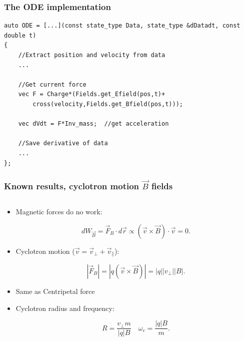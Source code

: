 \documentclass{beamer}
\begin{document}
\begin{frame}[fragile]
\frametitle{The ODE implementation}
\begin{lstlisting}
auto ODE = [...](const state_type Data, state_type &dDatadt, const double t)
{
    //Extract position and velocity from data
    ...

    //Get current force
    vec F = Charge*(Fields.get_Efield(pos,t)+
        cross(velocity,Fields.get_Bfield(pos,t)));

    vec dVdt = F*Inv_mass;  //get acceleration

    //Save derivative of data
    ...
};
\end{lstlisting}
\end{frame}


\begin{frame}
\frametitle{Known results, cyclotron motion $\vec{B}$ fields}
\begin{columns}
\begin{column}{0.5\linewidth}
\begin{itemize}
\item<1-> Magnetic forces do no work:

{
\begin{equation*}
dW_{\vec{B}}= \vec{F}_B \cdot d\vec{r}\propto (\vec{v}\times \vec{B})\cdot \vec{v} = 0.
\end{equation*}
}

\item<3-> Cyclotron motion ($\vec{v}=\vec{v}_\perp+\vec{v}_\parallel$):

{
\begin{equation*}
|\vec{F}_B| = |q ( \vec{v}\times \vec{B})| =|q| |v_{\perp}| |B|.
\end{equation*}
}
\item<4-> Same as Centripetal force

\item<5> Cyclotron radius and frequency:

\begin{equation*}
R = \frac{v_\perp m}{|q|B} \quad \omega_c =\frac{|q|B}{m}.
\end{equation*}


\end{itemize}
\end{column}
\end{columns}
\end{frame}
\end{document}
